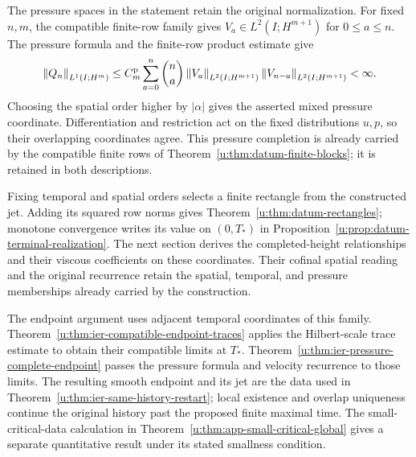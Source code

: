 The pressure spaces in the statement retain the original normalization.
For fixed \(n,m\), the compatible finite-row family gives
\(V_a\in L^2(I;H^{m+1})\) for \(0\le a\le n\).
The pressure formula and the finite-row product estimate give
\[
 \left\lVert Q_n\right\rVert_{L^1(I;H^m)}
 \le C_m^{\rm p}\sum_{a=0}^n\binom na
 \left\lVert V_a\right\rVert_{L^2(I;H^{m+1})}
 \left\lVert V_{n-a}\right\rVert_{L^2(I;H^{m+1})}<\infty.
\]
Choosing the spatial order higher by \(|\alpha|\) gives the asserted
mixed pressure coordinate.  Differentiation and restriction act on the
fixed distributions \(u,p\), so their overlapping coordinates agree.
This pressure completion is already carried by the compatible finite rows of
Theorem~\ref{u:thm:datum-finite-blocks}; it is retained in both descriptions.

Fixing temporal and spatial orders selects a finite rectangle from the
constructed jet. Adding its squared row norms gives
Theorem~\ref{u:thm:datum-rectangles}; monotone convergence writes its value
on \((0,T_*)\) in Proposition~\ref{u:prop:datum-terminal-realization}.
The next section derives the completed-height relationships and their
viscous coefficients on these coordinates. Their cofinal spatial reading
and the original recurrence retain the spatial, temporal, and pressure
memberships already carried by the construction.

The endpoint argument uses adjacent temporal coordinates of this family.
Theorem~\ref{u:thm:ier-compatible-endpoint-traces} applies the Hilbert-scale
trace estimate to obtain their compatible limits at \(T_*\).
Theorem~\ref{u:thm:ier-pressure-complete-endpoint} passes the pressure formula
and velocity recurrence to those limits. The resulting smooth endpoint
and its jet are the data used in
Theorem~\ref{u:thm:ier-same-history-restart}; local existence and overlap
uniqueness continue the original history past the proposed finite maximal
time. The small-critical-data calculation in
Theorem~\ref{u:thm:app-small-critical-global} gives a separate quantitative
result under its stated smallness condition.
